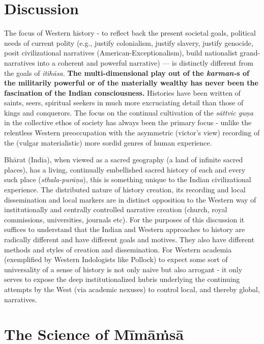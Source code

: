 \section*{Discussion}

The focus of Western history - to reflect back the present societal goals, political needs of current polity (e.g., justify colonialism, justify slavery, justify genocide, posit civilizational narratives (American-Exceptionalism), build nationalist grand-narratives into a coherent and powerful narrative) — is distinctly different from the goals of \textit{itihāsa.} \textbf{The multi-dimensional play out of the \textit{karman-}s of the militarily powerful or of the materially wealthy has never been the fascination of the Indian consciousness.} Histories have been written of saints, seers, spiritual seekers in much more excruciating detail than those of kings and conquerors. The focus on the continual cultivation of the \textit{sāttvic guṇa} in the collective ethos of society has always been the primary focus - unlike the relentless Western preoccupation with the asymmetric (victor’s view) recording of the (vulgar materialistic) more sordid genres of human experience.

Bhārat (India), when viewed as a sacred geography (a land of infinite sacred places), has a living, continually embellished sacred history of each and every such place (\textit{sthala-purāṇa}), this is something unique to the Indian civilizational experience. The distributed nature of history creation, its recording and local dissemination and local markers are in distinct opposition to the Western way of institutionally and centrally controlled narrative creation (church, royal commissions, universities, journals etc). For the purposes of this discussion it suffices to understand that the Indian and Western approaches to history are radically different and have different goals and motives. They also have different methods and styles of creation and dissemination. For Western academia (exemplified by Western Indologists like Pollock) to expect some sort of universality of a sense of history is not only naive but also arrogant - it only serves to expose the deep institutionalized hubris underlying the continuing attempts by the West (via academic nexuses) to control local, and thereby global, narratives.


\section*{The Science of Mīmāṁsā}

